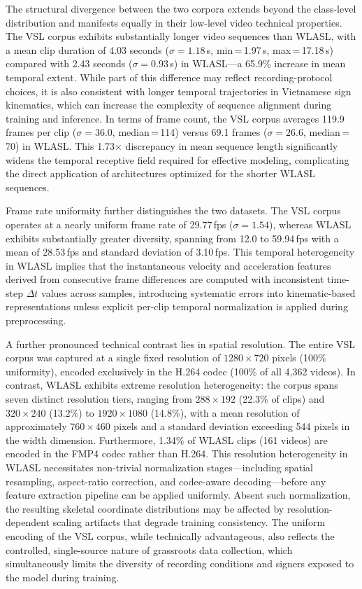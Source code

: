 \documentclass{ieeeaccess}
\begin{document}
The structural divergence between the two corpora extends beyond the class-level distribution and manifests equally in their low-level video technical properties. The VSL corpus exhibits substantially longer video sequences than WLASL, with a mean clip duration of 4.03 seconds ($\sigma = 1.18$\,s, min\,=\,1.97\,s, max\,=\,17.18\,s) compared with 2.43 seconds ($\sigma = 0.93$\,s) in WLASL—a 65.9\% increase in mean temporal extent. While part of this difference may reflect recording-protocol choices, it is also consistent with longer temporal trajectories in Vietnamese sign kinematics, which can increase the complexity of sequence alignment during training and inference. In terms of frame count, the VSL corpus averages 119.9 frames per clip ($\sigma = 36.0$, median\,=\,114) versus 69.1 frames ($\sigma = 26.6$, median\,=\,70) in WLASL. This 1.73$\times$ discrepancy in mean sequence length significantly widens the temporal receptive field required for effective modeling, complicating the direct application of architectures optimized for the shorter WLASL sequences.

Frame rate uniformity further distinguishes the two datasets. The VSL corpus operates at a nearly uniform frame rate of 29.77\,fps ($\sigma = 1.54$), whereas WLASL exhibits substantially greater diversity, spanning from 12.0 to 59.94\,fps with a mean of 28.53\,fps and standard deviation of 3.10\,fps. This temporal heterogeneity in WLASL implies that the instantaneous velocity and acceleration features derived from consecutive frame differences are computed with inconsistent time-step $\Delta t$ values across samples, introducing systematic errors into kinematic-based representations unless explicit per-clip temporal normalization is applied during preprocessing.

A further pronounced technical contrast lies in spatial resolution. The entire VSL corpus was captured at a single fixed resolution of $1280 \times 720$ pixels (100\% uniformity), encoded exclusively in the H.264 codec (100\% of all 4,362 videos). In contrast, WLASL exhibits extreme resolution heterogeneity: the corpus spans seven distinct resolution tiers, ranging from $288 \times 192$ (22.3\% of clips) and $320 \times 240$ (13.2\%) to $1920 \times 1080$ (14.8\%), with a mean resolution of approximately $760 \times 460$ pixels and a standard deviation exceeding 544 pixels in the width dimension. Furthermore, 1.34\% of WLASL clips (161 videos) are encoded in the FMP4 codec rather than H.264. This resolution heterogeneity in WLASL necessitates non-trivial normalization stages—including spatial resampling, aspect-ratio correction, and codec-aware decoding—before any feature extraction pipeline can be applied uniformly. Absent such normalization, the resulting skeletal coordinate distributions may be affected by resolution-dependent scaling artifacts that degrade training consistency. The uniform encoding of the VSL corpus, while technically advantageous, also reflects the controlled, single-source nature of grassroots data collection, which simultaneously limits the diversity of recording conditions and signers exposed to the model during training.
\end{document}

